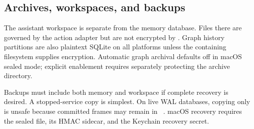 \subsection{Archives, workspaces, and backups}

The assistant workspace is separate from the memory database. Files there are governed by the action adapter but are not encrypted by \system{}. Graph history partitions are also plaintext SQLite on all platforms unless the containing filesystem supplies encryption. Automatic graph archival defaults off in macOS sealed mode; explicit enablement requires separately protecting the archive directory.

Backups must include both memory and workspace if complete recovery is desired. A stopped-service copy is simplest. On live WAL databases, copying only  is unsafe because committed frames may remain in ~\cite{sqlitewal}. macOS recovery requires the sealed file, its HMAC sidecar, and the Keychain recovery secret.

